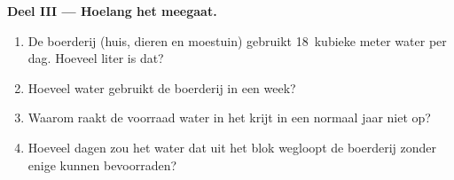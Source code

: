 \begin{problem}
\medskip
\noindent\textbf{Deel III --- Hoelang het meegaat.}
\begin{enumerate}[resume]
  \item De boerderij (huis, dieren en moestuin) gebruikt 18~kubieke meter
        water per dag. Hoeveel liter is dat?
  \item Hoeveel water gebruikt de boerderij in een week?
  \item Waarom raakt de voorraad water in het krijt in een normaal jaar niet
        op?
  \item Hoeveel dagen zou het water dat uit het blok wegloopt de boerderij
        zonder enige  kunnen bevoorraden?
\end{enumerate}
\end{problem}
